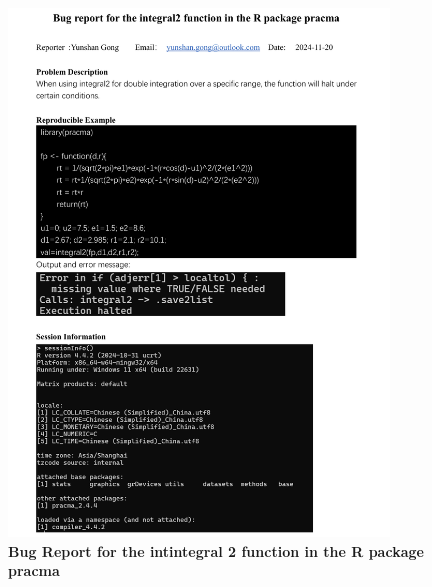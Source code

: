 \documentclass[cjjs]{ipart}
\theoremstyle{plain}
\begin{document}
\begin{figure}[H]
    \centering
    \includegraphics[width=0.90\textwidth]{11.png} 
    \caption{\textbf{Bug Report for the intintegral 2 function in the R package pracma}}
    \label{fig:dartboard}
\end{figure}
\end{document}
